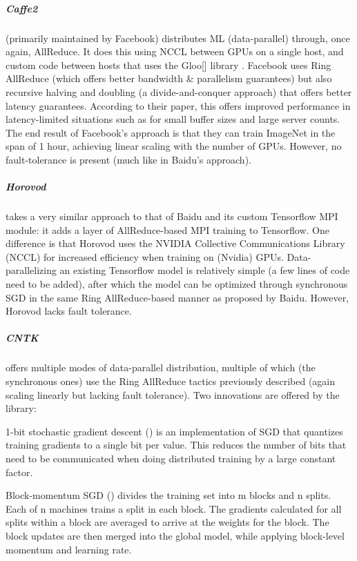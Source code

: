 \subparagraph{Caffe2}

(primarily maintained by Facebook) distributes ML (data-parallel) through, once again, AllReduce. It does this using NCCL between GPUs on a single host, and custom code between hosts that uses the Gloo[] library . Facebook uses Ring AllReduce (which offers better bandwidth \& parallelism guarantees) but also recursive halving and doubling (a divide-and-conquer approach) that offers better latency guarantees. According to their paper, this offers improved performance in latency-limited situations such as for small buffer sizes and large server counts. The end result of Facebook’s approach is that they can train ImageNet in the span of 1 hour\citep{Goyal2017}, achieving linear scaling with the number of GPUs. However, no fault-tolerance is present (much like in Baidu's approach).

\subparagraph{Horovod\citep{Horovod2018}}

takes a very similar approach to that of Baidu and its custom Tensorflow MPI module: it adds a layer of AllReduce-based MPI training to Tensorflow. One difference is that Horovod uses the NVIDIA Collective Communications Library (NCCL) for increased efficiency when training on (Nvidia) GPUs. Data-parallelizing an existing Tensorflow model is relatively simple (a few lines of code need to be added), after which the model can be optimized through synchronous SGD in the same Ring AllReduce-based manner as proposed by Baidu. However, Horovod lacks fault tolerance.

\subparagraph{CNTK}

offers multiple modes of data-parallel distribution, multiple of which (the synchronous ones) use the Ring AllReduce tactics previously described (again scaling linearly but lacking fault tolerance). Two innovations are offered by the library:

1-bit stochastic gradient descent (\citet{Seide2014}) is an implementation of SGD that quantizes training gradients to a single bit per value. This reduces the number of bits that need to be communicated when doing distributed training by a large constant factor.

Block-momentum SGD (\citet{Chen2016}) divides the training set into m blocks and n splits. Each of n machines trains a split in each block. The gradients calculated for all splits within a block are averaged to arrive at the weights for the block. The block updates are then merged into the global model, while applying block-level momentum and learning rate. 



